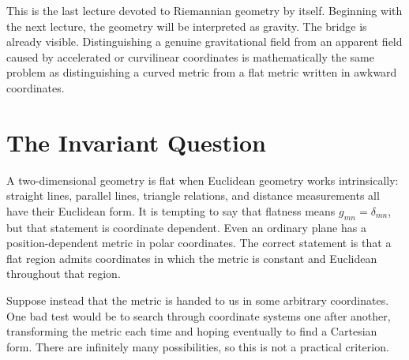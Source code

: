 \begin{classroomqa}
\end{classroomqa}

This is the last lecture devoted to Riemannian geometry by itself.
Beginning with the next lecture, the geometry will be interpreted as
gravity. The bridge is already visible. Distinguishing a genuine
gravitational field from an apparent field caused by accelerated or
curvilinear coordinates is mathematically the same problem as
distinguishing a curved metric from a flat metric written in awkward
coordinates.

\section{The Invariant Question}

A two-dimensional geometry is flat when Euclidean geometry works
intrinsically: straight lines, parallel lines, triangle relations, and
distance measurements all have their Euclidean form. It is tempting to
say that flatness means
\(g_{mn}=\delta_{mn}\), but that statement is coordinate dependent.
Even an ordinary plane has a position-dependent metric in polar
coordinates. The correct statement is that a flat region admits
coordinates in which the metric is constant and Euclidean throughout
that region.

Suppose instead that the metric is handed to us in some arbitrary
coordinates. One bad test would be to search through coordinate
systems one after another, transforming the metric each time and
hoping eventually to find a Cartesian form. There are infinitely many
possibilities, so this is not a practical criterion.

